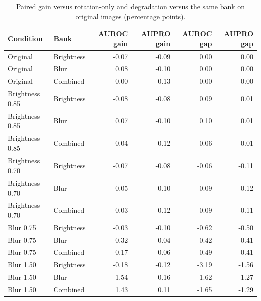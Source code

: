 \begin{table}[htbp]
\caption{Paired gain versus rotation-only and degradation versus the same bank on original images (percentage points).}
\label{tab:paired_primary}
\begin{tabular}{llrrrr}
\toprule
Condition & Bank & AUROC gain & AUPRO gain & AUROC gap & AUPRO gap \\
\midrule
Original & Brightness & -0.07 & -0.09 & 0.00 & 0.00 \\
Original & Blur & 0.08 & -0.10 & 0.00 & 0.00 \\
Original & Combined & 0.00 & -0.13 & 0.00 & 0.00 \\
Brightness 0.85 & Brightness & -0.08 & -0.08 & 0.09 & 0.01 \\
Brightness 0.85 & Blur & 0.07 & -0.10 & 0.10 & 0.01 \\
Brightness 0.85 & Combined & -0.04 & -0.12 & 0.06 & 0.01 \\
Brightness 0.70 & Brightness & -0.07 & -0.08 & -0.06 & -0.11 \\
Brightness 0.70 & Blur & 0.05 & -0.10 & -0.09 & -0.12 \\
Brightness 0.70 & Combined & -0.03 & -0.12 & -0.09 & -0.11 \\
Blur 0.75 & Brightness & -0.03 & -0.10 & -0.62 & -0.50 \\
Blur 0.75 & Blur & 0.32 & -0.04 & -0.42 & -0.41 \\
Blur 0.75 & Combined & 0.17 & -0.06 & -0.49 & -0.41 \\
Blur 1.50 & Brightness & -0.18 & -0.12 & -3.19 & -1.56 \\
Blur 1.50 & Blur & 1.54 & 0.16 & -1.62 & -1.27 \\
Blur 1.50 & Combined & 1.43 & 0.11 & -1.65 & -1.29 \\
\bottomrule
\end{tabular}
\end{table}
